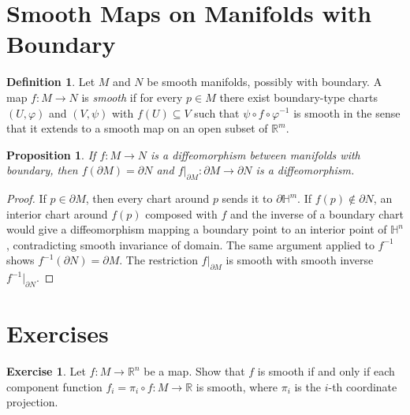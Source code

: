 \documentclass[12pt,a4paper,openany]{book}
\newtheorem{proposition}[theorem]{Proposition}
\theoremstyle{definition}
\newtheorem{definition}[theorem]{Definition}
\newtheorem{exercise}{Exercise}[chapter]
\theoremstyle{remark}
\newcommand{\R}{\mathbb{R}}
\begin{document}
\section{Smooth Maps on Manifolds with Boundary}
\label{sec:smooth-maps-boundary}

\begin{definition}\label{def:smooth-map-boundary}
Let $M$ and $N$ be smooth manifolds, possibly with boundary.  A map
$f \colon M \to N$ is \emph{smooth} if for every $p \in M$ there exist
boundary-type charts $(U,\varphi)$ and $(V,\psi)$ with
$f(U) \subseteq V$ such that $\psi \circ f \circ \varphi^{-1}$ is smooth
in the sense that it extends to a smooth map on an open subset of $\R^m$.
\end{definition}

\begin{proposition}\label{prop:smooth-boundary-to-boundary}
If $f \colon M \to N$ is a diffeomorphism between manifolds with boundary,
then $f(\partial M) = \partial N$ and
$f|_{\partial M} \colon \partial M \to \partial N$ is a diffeomorphism.
\end{proposition}

\begin{proof}
If $p \in \partial M$, then every chart around $p$ sends it to
$\partial \mathbb{H}^m$.  If $f(p) \notin \partial N$, an interior chart
around $f(p)$ composed with $f$ and the inverse of a boundary chart would
give a diffeomorphism mapping a boundary point to an interior point of
$\mathbb{H}^n$, contradicting smooth invariance of domain.  The same
argument applied to $f^{-1}$ shows $f^{-1}(\partial N) = \partial M$.
The restriction $f|_{\partial M}$ is smooth with smooth inverse
$f^{-1}|_{\partial N}$.
\end{proof}

\section{Exercises}
\label{sec:exercises-ch2}

\begin{exercise}\label{exo:smooth-iff-components}
Let $f \colon M \to \R^n$ be a map.  Show that $f$ is smooth if and only
if each component function $f_i = \pi_i \circ f \colon M \to \R$ is smooth,
where $\pi_i$ is the $i$-th coordinate projection.
\end{exercise}
\end{document}
